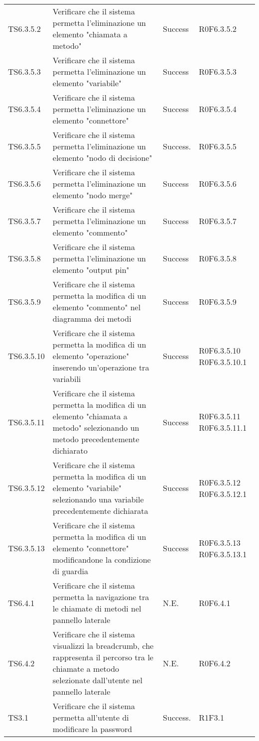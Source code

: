 \begin{longtable}{p{2.5cm}!{\VRule[1pt]}p{6cm}!{\VRule[1pt]}p{1.5cm}!{\VRule[1pt]}p{3cm}}
TS6.3.5.2 & Verificare che il sistema permetta l'eliminazione un elemento "chiamata a metodo" & Success& R0F6.3.5.2\\
TS6.3.5.3 & Verificare che il sistema permetta l'eliminazione un elemento "variabile" & Success & R0F6.3.5.3\\
TS6.3.5.4 & Verificare che il sistema permetta l'eliminazione un elemento "connettore" & Success & R0F6.3.5.4\\
TS6.3.5.5 & Verificare che il sistema permetta l'eliminazione un elemento "nodo di decisione" & Success. & R0F6.3.5.5\\
TS6.3.5.6 & Verificare che il sistema permetta l'eliminazione un elemento "nodo merge" & Success & R0F6.3.5.6\\
TS6.3.5.7 & Verificare che il sistema permetta l'eliminazione un elemento "commento" & Success & R0F6.3.5.7\\
TS6.3.5.8 & Verificare che il sistema permetta l'eliminazione un elemento "output pin" & Success & R0F6.3.5.8\\
TS6.3.5.9 & Verificare che il sistema permetta la modifica di un elemento "commento" nel diagramma dei metodi & Success & R0F6.3.5.9\\
TS6.3.5.10 & Verificare che il sistema permetta la modifica di un elemento "operazione" inserendo un'operazione tra variabili & Success & R0F6.3.5.10 R0F6.3.5.10.1\\
TS6.3.5.11 & Verificare che il sistema permetta la modifica di un elemento "chiamata a metodo" selezionando un metodo precedentemente dichiarato & Success & R0F6.3.5.11 R0F6.3.5.11.1\\
TS6.3.5.12 & Verificare che il sistema permetta la modifica di un elemento "variabile" selezionando una variabile precedentemente dichiarata & Success & R0F6.3.5.12 R0F6.3.5.12.1\\
TS6.3.5.13 & Verificare che il sistema permetta la modifica di un elemento "connettore" modificandone la condizione di guardia & Success & R0F6.3.5.13 R0F6.3.5.13.1\\
TS6.4.1 & Verificare che il sistema permetta la navigazione tra le chiamate di metodi nel pannello laterale & N.E. & R0F6.4.1\\
TS6.4.2 & Verificare che il sistema visualizzi la breadcrumb, che rappresenta il percorso tra le chiamate a metodo selezionate dall'utente nel pannello laterale & N.E. & R0F6.4.2\\
TS3.1 & Verificare che il sistema permetta all'utente di modificare la password & Success. & R1F3.1 \\

\end{longtable}
